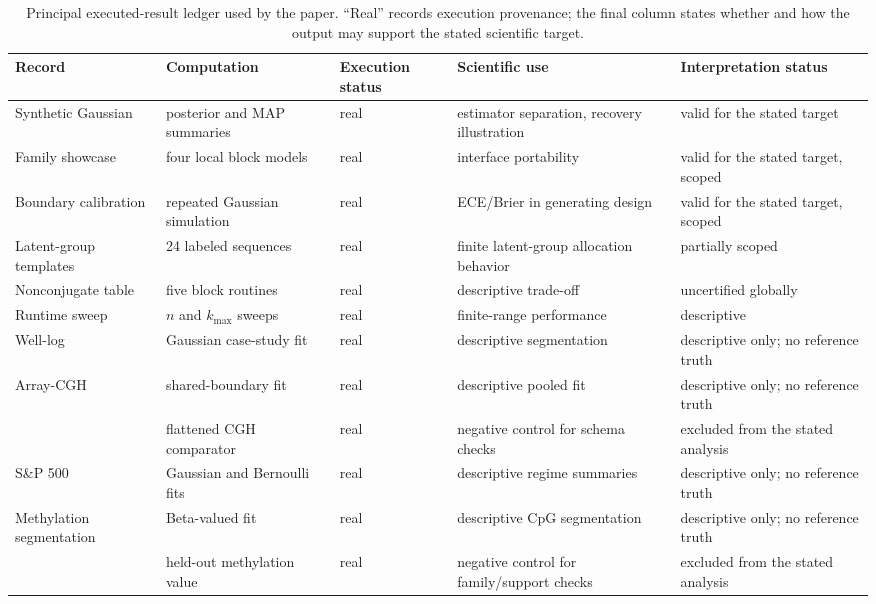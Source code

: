 \begin{table}[H]
\centering
\scriptsize
\caption{Principal executed-result ledger used by the paper. ``Real'' records execution provenance; the final column states whether and how the output may support the stated scientific target.}
\label{tab:result-ledger-app}
\begin{tabularx}{0.98\textwidth}{@{}L{0.18\textwidth}L{0.19\textwidth}L{0.15\textwidth}Y L{0.16\textwidth}@{}}
\toprule
Record & Computation & Execution status & Scientific use & Interpretation status \\
\midrule
Synthetic Gaussian & posterior and MAP summaries & real & estimator separation, recovery illustration & valid for the stated target \\
Family showcase & four local block models & real & interface portability & valid for the stated target, scoped \\
Boundary calibration & repeated Gaussian simulation & real & ECE/Brier in generating design & valid for the stated target, scoped \\
Latent-group templates & 24 labeled sequences & real & finite latent-group allocation behavior & partially scoped \\
Nonconjugate table & five block routines & real & descriptive trade-off & uncertified globally \\
Runtime sweep & $n$ and $k_{\max}$ sweeps & real & finite-range performance & descriptive \\
Well-log & Gaussian case-study fit & real & descriptive segmentation & descriptive only; no reference truth \\
Array-CGH & shared-boundary fit & real & descriptive pooled fit & descriptive only; no reference truth \\
 & flattened CGH comparator & real & negative control for schema checks & excluded from the stated analysis \\
S\&P 500 & Gaussian and Bernoulli fits & real & descriptive regime summaries & descriptive only; no reference truth \\
Methylation segmentation & Beta-valued fit & real & descriptive CpG segmentation & descriptive only; no reference truth \\
 & held-out methylation value & real & negative control for family/support checks & excluded from the stated analysis \\
\bottomrule
\end{tabularx}
\end{table}

